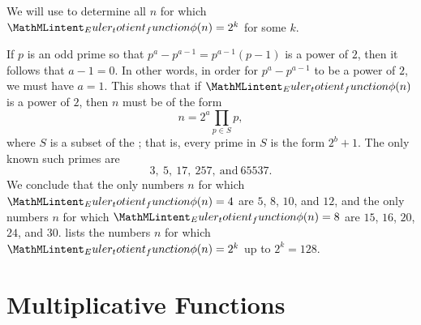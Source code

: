 \begin{example}
  We will use  to determine all $n$ for which $\totient(n)=2^k$ for some $k$.
  
  If $p$ is an odd prime so that $p^a-p^{a-1}=p^{a-1}(p-1)$ is a power of $2$, then it follows that $a-1=0$. In other words, in order for $p^a-p^{a-1}$ to be a power of $2$, we must have $a=1$. This shows that if $\totient(n)$ is a power of $2$, then $n$ must be of the form
  \begin{equation*}
    n=2^a\prod_{p\in S}p,
  \end{equation*}
  where $S$ is a subset of the ; that is, every prime in $S$ is the form $2^b+1$. The only known such primes are
  \begin{equation*}
    3,~5,~17,~257,~\text{and}~65537.
  \end{equation*}
  We conclude that the only numbers $n$ for which $\totient(n)=4$ are $5$, $8$, $10$, and $12$, and the only numbers $n$ for which $\totient(n)=8$ are $15$, $16$, $20$, $24$, and $30$.  lists the numbers $n$ for which $\totient(n)=2^k$ up to $2^k=128$.
\end{example}



\section{Multiplicative Functions}


